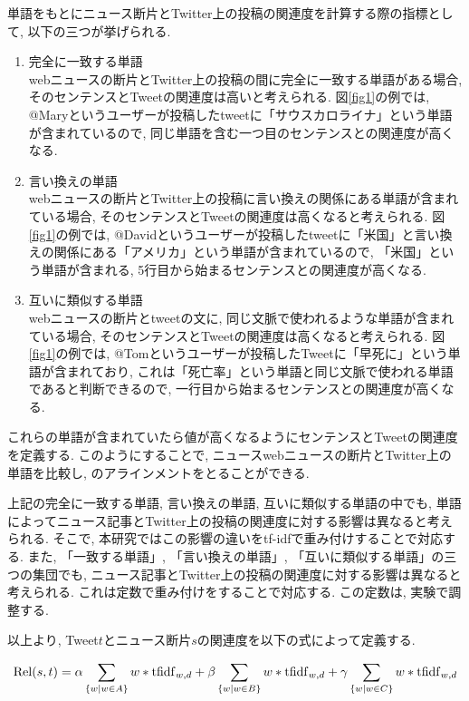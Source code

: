 \documentclass[12pt]{jarticle}
\begin{document}
単語をもとにニュース断片とTwitter上の投稿の関連度を計算する際の指標として, 以下の三つが挙げられる.

\begin{enumerate}
 \item 完全に一致する単語\\
    webニュースの断片とTwitter上の投稿の間に完全に一致する単語がある場合, そのセンテンスとTweetの関連度は高いと考えられる. 図\ref{fig1}の例では, @Maryというユーザーが投稿したtweetに「サウスカロライナ」という単語が含まれているので, 同じ単語を含む一つ目のセンテンスとの関連度が高くなる.
 \item 言い換えの単語\\
    webニュースの断片とTwitter上の投稿に言い換えの関係にある単語が含まれている場合, そのセンテンスとTweetの関連度は高くなると考えられる. 図\ref{fig1}の例では, @Davidというユーザーが投稿したtweetに「米国」と言い換えの関係にある「アメリカ」という単語が含まれているので, 「米国」という単語が含まれる, 5行目から始まるセンテンスとの関連度が高くなる.
 \item 互いに類似する単語\\
    webニュースの断片とtweetの文に, 同じ文脈で使われるような単語が含まれている場合, そのセンテンスとTweetの関連度は高くなると考えられる. 図\ref{fig1}の例では, @Tomというユーザーが投稿したTweetに「早死に」という単語が含まれており, これは「死亡率」という単語と同じ文脈で使われる単語であると判断できるので, 一行目から始まるセンテンスとの関連度が高くなる.
\end{enumerate}

これらの単語が含まれていたら値が高くなるようにセンテンスとTweetの関連度を定義する. このようにすることで, ニュースwebニュースの断片とTwitter上の単語を比較し, のアラインメントをとることができる.

上記の完全に一致する単語, 言い換えの単語, 互いに類似する単語の中でも, 単語によってニュース記事とTwitter上の投稿の関連度に対する影響は異なると考えられる. そこで, 本研究ではこの影響の違いをtf-idfで重み付けすることで対応する. また, 「一致する単語」, 「言い換えの単語」, 「互いに類似する単語」の三つの集団でも, ニュース記事とTwitter上の投稿の関連度に対する影響は異なると考えられる. これは定数で重み付けをすることで対応する. この定数は, 実験で調整する.

以上より, Tweet$t$とニュース断片$s$の関連度を以下の式によって定義する.

\begin{equation}
  {\rm Rel}(s, t) = \alpha \sum_{\{w|w \in A\}} w * {\rm tfidf}_{w, d} +
                    \beta  \sum_{\{w|w \in B\}} w * {\rm tfidf}_{w, d} +
                    \gamma \sum_{\{w|w \in C\}} w * {\rm tfidf}_{w, d}
  \label{eq:rel}
\end{equation}
\end{document}
